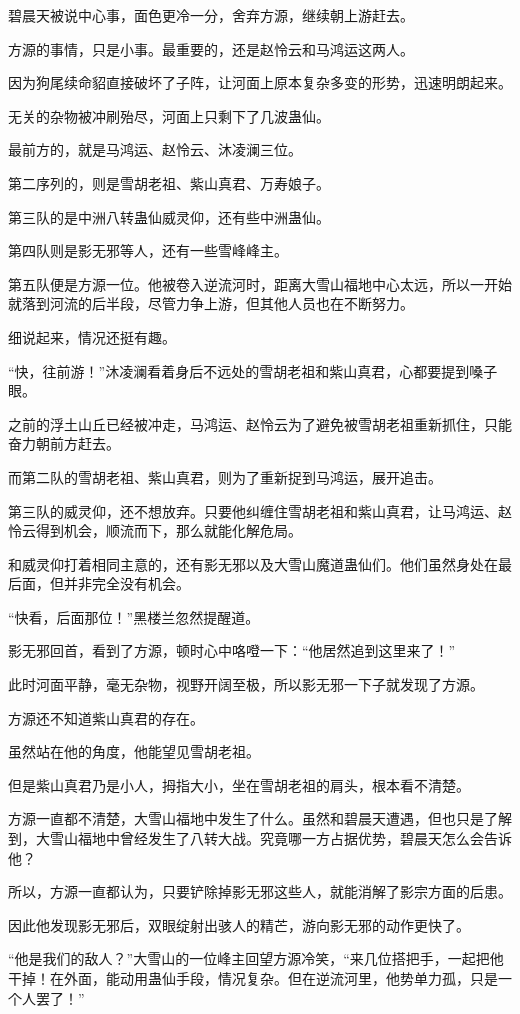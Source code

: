 \begin{this_body}
碧晨天被说中心事，面色更冷一分，舍弃方源，继续朝上游赶去。

方源的事情，只是小事。最重要的，还是赵怜云和马鸿运这两人。

因为狗尾续命貂直接破坏了子阵，让河面上原本复杂多变的形势，迅速明朗起来。

无关的杂物被冲刷殆尽，河面上只剩下了几波蛊仙。

最前方的，就是马鸿运、赵怜云、沐凌澜三位。

第二序列的，则是雪胡老祖、紫山真君、万寿娘子。

第三队的是中洲八转蛊仙威灵仰，还有些中洲蛊仙。

第四队则是影无邪等人，还有一些雪峰峰主。

第五队便是方源一位。他被卷入逆流河时，距离大雪山福地中心太远，所以一开始就落到河流的后半段，尽管力争上游，但其他人员也在不断努力。

细说起来，情况还挺有趣。

“快，往前游！”沐凌澜看着身后不远处的雪胡老祖和紫山真君，心都要提到嗓子眼。

之前的浮土山丘已经被冲走，马鸿运、赵怜云为了避免被雪胡老祖重新抓住，只能奋力朝前方赶去。

而第二队的雪胡老祖、紫山真君，则为了重新捉到马鸿运，展开追击。

第三队的威灵仰，还不想放弃。只要他纠缠住雪胡老祖和紫山真君，让马鸿运、赵怜云得到机会，顺流而下，那么就能化解危局。

和威灵仰打着相同主意的，还有影无邪以及大雪山魔道蛊仙们。他们虽然身处在最后面，但并非完全没有机会。

“快看，后面那位！”黑楼兰忽然提醒道。

影无邪回首，看到了方源，顿时心中咯噔一下：“他居然追到这里来了！”

此时河面平静，毫无杂物，视野开阔至极，所以影无邪一下子就发现了方源。

方源还不知道紫山真君的存在。

虽然站在他的角度，他能望见雪胡老祖。

但是紫山真君乃是小人，拇指大小，坐在雪胡老祖的肩头，根本看不清楚。

方源一直都不清楚，大雪山福地中发生了什么。虽然和碧晨天遭遇，但也只是了解到，大雪山福地中曾经发生了八转大战。究竟哪一方占据优势，碧晨天怎么会告诉他？

所以，方源一直都认为，只要铲除掉影无邪这些人，就能消解了影宗方面的后患。

因此他发现影无邪后，双眼绽射出骇人的精芒，游向影无邪的动作更快了。

“他是我们的敌人？”大雪山的一位峰主回望方源冷笑，“来几位搭把手，一起把他干掉！在外面，能动用蛊仙手段，情况复杂。但在逆流河里，他势单力孤，只是一个人罢了！”


\end{this_body}
